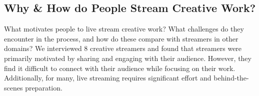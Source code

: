 

\subsection{Why \& How do People Stream Creative Work?}
What motivates people to live stream creative work? What challenges do they encounter in the process, and how do these compare with streamers in other domains? We interviewed 8 creative streamers and found that streamers were primarily motivated by sharing and engaging with their audience. However, they find it difficult to connect with their audience while focusing on their work. Additionally, for many, live streaming requires significant effort and behind-the-scenes preparation. 


